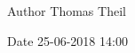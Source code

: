 \begin{DoxyAuthor}{Author}
Thomas Theil 
\end{DoxyAuthor}
\begin{DoxyDate}{Date}
25-\/06-\/2018 14\+:00 
\end{DoxyDate}
